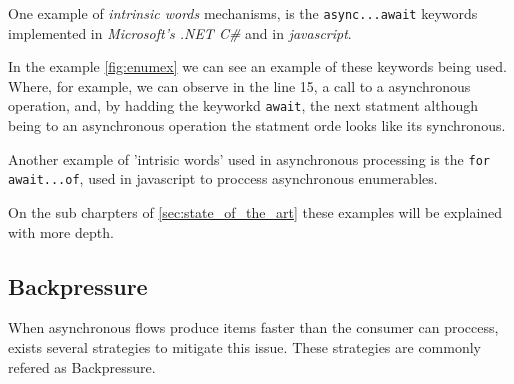 	One example of \textit{intrinsic words} mechanisms, is the \texttt{async...await} keywords implemented in \textit{Microsoft's .NET C\#} and in \textit{javascript}. 
	
	In the example \ref{fig:enumex} we can see an example of these keywords being used. 
	Where, for example, we can observe in the line 15, a call to a asynchronous operation, and, by hadding the keyworkd \texttt{await}, the next statment although being to an asynchronous operation the statment orde looks like its synchronous. 
	
	Another example of 'intrisic words' used in asynchronous processing is the \texttt{for await...of}, used in javascript to proccess asynchronous enumerables. 
	

	On the sub charpters of \ref{sec:state_of_the_art} these examples will be explained with more depth.
	\clearpage

	\subsection{Backpressure} 
	When asynchronous flows produce  items faster than the consumer can proccess, exists several strategies to mitigate this issue. These strategies are commonly refered as Backpressure.


